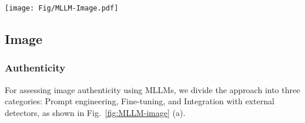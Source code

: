 \begin{figure*}[!ht]
  \centering
    \texttt{[image: Fig/MLLM-Image.pdf]}
    \caption{Illustrating of MLLM-based detection methodologies for AI-generated images. ``Mask + Image → Text" approach is reproduced from~\cite{li2024forgerygpt}, ``Text + Image → Mask" approach is reproduced from~\cite{huang2024sida}, and Independent Mask Localization method is adapted from~\cite{lian2024large}}
    \label{fig:MLLM-image}
\end{figure*}

\subsection{Image}
\subsubsection{\textbf{Authenticity}}
For assessing image authenticity using MLLMs, we divide the approach into three categories: Prompt engineering, Fine-tuning, and Integration with external detectors, as shown in Fig.~\ref{fig:MLLM-image} (a).
